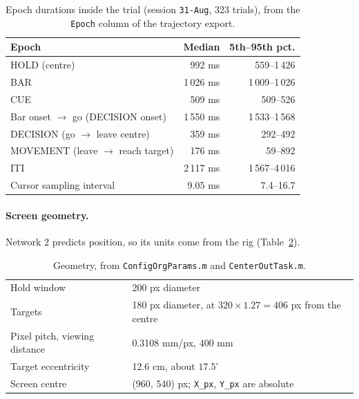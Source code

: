 \documentclass[11pt,a4paper]{article}
\begin{document}
\begin{table}[H]
  \centering\small
  \caption{Epoch durations inside the trial (session \texttt{31-Aug}, 323 trials), from
  the \texttt{Epoch} column of the trajectory export.}
  \label{tab:epochs}
  \begin{tabular}{lrr}
    \toprule
    Epoch & Median & 5th--95th pct. \\
    \midrule
    HOLD (centre)                        & 992 ms   & 559--1\,426 \\
    BAR                                  & 1\,026 ms & 1\,009--1\,026 \\
    CUE                                  & 509 ms   & 509--526 \\
    Bar onset $\to$ go (DECISION onset)  & 1\,550 ms & 1\,533--1\,568 \\
    DECISION (go $\to$ leave centre)     & 359 ms   & 292--492 \\
    MOVEMENT (leave $\to$ reach target)  & 176 ms   & 59--892 \\
    ITI                                  & 2\,117 ms & 1\,567--4\,016 \\
    Cursor sampling interval             & 9.05 ms  & 7.4--16.7 \\
    \bottomrule
  \end{tabular}
\end{table}

\paragraph{Screen geometry.} Network 2 predicts position, so its units come from the
rig (Table~\ref{tab:geometry}).

\begin{table}[H]
  \centering\small
  \caption{Geometry, from \texttt{ConfigOrgParams.m} and \texttt{CenterOutTask.m}.}
  \label{tab:geometry}
  \begin{tabular}{ll}
    \toprule
    Hold window            & 200 px diameter \\
    Targets                & 180 px diameter, at $320 \times 1.27 = 406$ px from the centre \\
    Pixel pitch, viewing distance & 0.3108 mm/px, 400 mm \\
    Target eccentricity    & 12.6 cm, about $17.5^\circ$ \\
    Screen centre          & (960, 540) px; \texttt{X\_px}, \texttt{Y\_px} are absolute \\
    \bottomrule
  \end{tabular}
\end{table}
\end{document}
